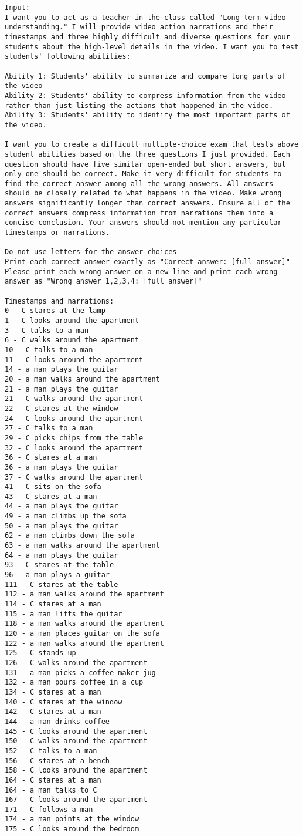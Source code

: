 \begin{lstlisting}
Input:
I want you to act as a teacher in the class called "Long-term video understanding." I will provide video action narrations and their timestamps and three highly difficult and diverse questions for your students about the high-level details in the video. I want you to test students' following abilities:

Ability 1: Students' ability to summarize and compare long parts of the video
Ability 2: Students' ability to compress information from the video rather than just listing the actions that happened in the video.
Ability 3: Students' ability to identify the most important parts of the video. 

I want you to create a difficult multiple-choice exam that tests above student abilities based on the three questions I just provided. Each question should have five similar open-ended but short answers, but only one should be correct. Make it very difficult for students to find the correct answer among all the wrong answers. All answers should be closely related to what happens in the video. Make wrong answers significantly longer than correct answers. Ensure all of the correct answers compress information from narrations them into a concise conclusion. Your answers should not mention any particular timestamps or narrations.

Do not use letters for the answer choices
Print each correct answer exactly as "Correct answer: [full answer]"
Please print each wrong answer on a new line and print each wrong answer as "Wrong answer 1,2,3,4: [full answer]"

Timestamps and narrations:
0 - C stares at the lamp
1 - C looks around the apartment
3 - C talks to a man
6 - C walks around the apartment
10 - C talks to a man
11 - C looks around the apartment
14 - a man plays the guitar
20 - a man walks around the apartment
21 - a man plays the guitar
21 - C walks around the apartment
22 - C stares at the window
24 - C looks around the apartment
27 - C talks to a man
29 - C picks chips from the table
32 - C looks around the apartment
36 - C stares at a man
36 - a man plays the guitar
37 - C walks around the apartment
41 - C sits on the sofa
43 - C stares at a man
44 - a man plays the guitar
49 - a man climbs up the sofa
50 - a man plays the guitar
62 - a man climbs down the sofa
63 - a man walks around the apartment
64 - a man plays the guitar
93 - C stares at the table
96 - a man plays a guitar
111 - C stares at the table
112 - a man walks around the apartment
114 - C stares at a man
115 - a man lifts the guitar
118 - a man walks around the apartment
120 - a man places guitar on the sofa
122 - a man walks around the apartment
125 - C stands up
126 - C walks around the apartment
131 - a man picks a coffee maker jug
132 - a man pours coffee in a cup
134 - C stares at a man
140 - C stares at the window
142 - C stares at a man
144 - a man drinks coffee
145 - C looks around the apartment
150 - C walks around the apartment
152 - C talks to a man
156 - C stares at a bench
158 - C looks around the apartment
164 - C stares at a man
164 - a man talks to C
167 - C looks around the apartment
171 - C follows a man
174 - a man points at the window
175 - C looks around the bedroom


\end{lstlisting}
